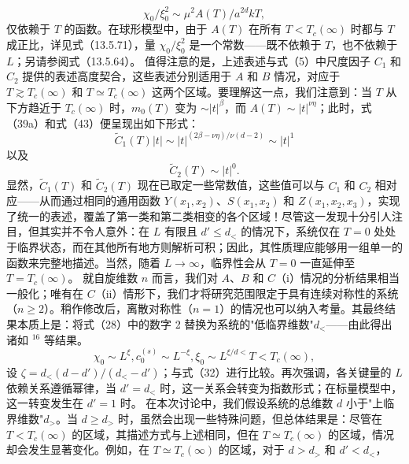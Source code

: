 \begin{equation}\tag{14.4.102}\label{eq:14.4.102}
\chi _ { 0 } / \xi _ { 0 } ^{2} \sim \mu ^{2} A ( T ) / a ^{2 d} k T ,
\end{equation}
仅依赖于 \(T\) 的函数。在球形模型中，由于 \(A(T)\) 在所有 \(T < T_c(\infty)\) 时都与 \(T\) 成正比，详见式（13.5.71），量 \(\chi_0/\xi_0^2\) 是一个常数——既不依赖于 \(T\)，也不依赖于 \(L\)；另请参阅式（13.5.64）。
值得注意的是，上述表述与式（5）中尺度因子 \(C_1\) 和 \(C_2\) 提供的表述高度契合，这些表述分别适用于 \(A\) 和 \(B\) 情况，对应于 \(T \gtrsim T_c(\infty)\) 和 \(T \simeq T_c(\infty)\) 这两个区域。要理解这一点，我们注意到：当 \(T\) 从下方趋近于 \(T_c(\infty)\) 时，\(m_0(T)\) 变为 \(\sim |t|^{\beta}\)，而 \(A(T) \sim |t|^{\nu\eta}\)；此时，式（39a）和式（43）便呈现出如下形式：
\begin{equation}\tag{14.4.103}\label{eq:14.4.103}
\tilde { C } _ { 1 } ( T ) | t | \sim | t | ^{( 2 \beta - \nu \eta ) / \nu ( d - 2 )} \sim | t | ^{1}
\end{equation}
以及
\begin{equation}\tag{14.4.104}\label{eq:14.4.104}
\tilde { C } _ { 2 } ( T ) \sim | t | ^{0} .
\end{equation}
显然，\(\tilde{C}_{1}(T)\) 和 \(\tilde{C}_{2}(T)\) 现在已取定一些常数值，这些值可以与 \(C_{1}\) 和 \(C_{2}\) 相对应——从而通过相同的通用函数 \(Y(x_{1},x_{2})\)、\(S(x_{1},x_{2})\) 和 \(Z(x_{1},x_{2},x_{3})\)，实现了统一的表述，覆盖了第一类和第二类相变的各个区域！尽管这一发现十分引人注目，但其实并不令人意外：在 \(L\) 有限且 \(d' \leq d_{<}\) 的情况下，系统仅在 \(T=0\) 处处于临界状态，而在其他所有地方则解析可积；因此，其性质理应能够用一组单一的函数来完整地描述。当然，随着 \(L \to \infty\)，临界性会从 \(T=0\) 一直延伸至 \(T=T_{c}(\infty)\)。
就自旋维数 \(n\) 而言，我们对 \(A\)、\(B\) 和 \(C\)（i）情况的分析结果相当一般化；唯有在 \(C\)（ii）情形下，我们才将研究范围限定于具有连续对称性的系统（\(n \geq 2\)）。稍作修改后，离散对称性（\(n = 1\)）的情况也可以纳入考量。其最终结果本质上是：将式（28）中的数字 2 替换为系统的"低临界维数"\(d_{<}\)——由此得出诸如 \(^{16}\) 等结果。
\begin{equation}\tag{14.4.105}\label{eq:14.4.105}
\chi _ { 0 } \sim L ^{\xi} ,  c _ { 0 } ^{( s )} \sim L ^{- \xi} ,  \xi _ { 0 } \sim L ^{\xi / d <}  T < T _ { c } ( \infty ) ,
\end{equation}
设 \(\zeta = d_{<}(d - d')/(d_{<} - d')\)；与式（32）进行比较。再次强调，各关键量的 \(L\) 依赖关系遵循幂律，当 \(d' = d_{<}\) 时，这一关系会转变为指数形式；在标量模型中，这一转变发生在 \(d' = 1\) 时。
在本次讨论中，我们假设系统的总维数 \(d\) 小于"上临界维数"\(d_{>}\)。当 \(d \geq d_{>}\) 时，虽然会出现一些特殊问题，但总体结果是：尽管在 \(T < T_{c}(\infty)\) 的区域，其描述方式与上述相同，但在 \(T \simeq T_{c}(\infty)\) 的区域，情况却会发生显著变化。例如，在 \(T \simeq T_{c}(\infty)\) 的区域，对于 \(d > d_{>}\) 和 \(d' < d_{<}\)，
